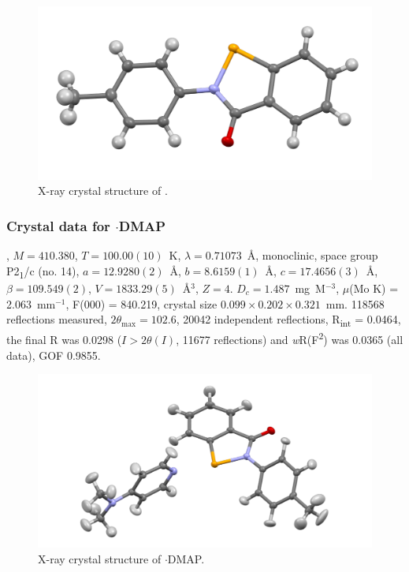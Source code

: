 \begin{refsection}
\begin{figure}
  \includegraphics[width=0.6\linewidth]{Figures/ebs-4me-xtal.pdf}
  \caption{X-ray crystal structure of \texorpdfstring{}{C14 H11 N O Se}.}
\end{figure}

\subsubsection{Crystal data for \texorpdfstring{$\cdot$DMAP}{C21 H21 N3 O Se}}
, $M=410.380$, $T=100.00(10)$~K, $\lambda=0.71073$~\AA, monoclinic, space group P2\textsubscript{1}/c (no. 14), $a = 12.9280(2)$~\AA, $b = 8.6159(1)$~\AA, $c = 17.4656(3)$~\AA, $\beta = 109.549(2)$\degree, $V = 1833.29(5)$~\AA$^{3}$, $Z = 4$. $D_{c}= 1.487$~mg~M$^{-3}$, $\mu$(Mo K\a) = 2.063~mm$^{-1}$, F(000) = 840.219, crystal size $0.099 \times 0.202 \times 0.321$~mm. 118568 reflections measured, $2\theta_{\mathrm{max}}=102.6$\degree, 20042 independent reflections, R\textsubscript{int} = 0.0464, the final R was 0.0298 ($I > 2\theta(I)$, 11677 reflections) and \emph{w}R(F\textsuperscript{2}) was 0.0365 (all data), GOF 0.9855.

\begin{figure}
  \includegraphics[width=0.6\linewidth]{Figures/ebs-4me-dmap-xtal.pdf}
  \caption{X-ray crystal structure of \texorpdfstring{$\cdot$DMAP}{C21 H21 N3 O Se}.}
\end{figure}


\end{refsection}
